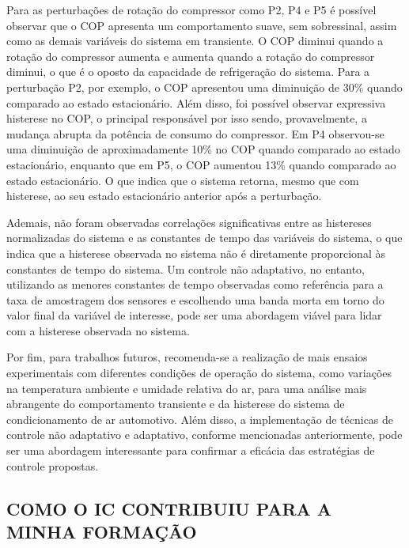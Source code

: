 Para as perturbações de rotação do compressor como P2, P4 e P5 é possível observar que o COP apresenta um comportamento suave, sem sobressinal, assim como as demais variáveis do sistema em transiente. O COP diminui quando a rotação do compressor aumenta e aumenta quando a rotação do compressor diminui, o que é o oposto da capacidade de refrigeração do sistema. Para a perturbação P2, por exemplo, o COP apresentou uma diminuição de 30\% quando comparado ao estado estacionário. 
\newpage
Além disso, foi possível observar expressiva histerese no COP, o principal responsável por isso sendo, provavelmente, a mudança abrupta da potência de consumo do compressor. Em P4  observou-se uma diminuição de aproximadamente 10\% no COP quando comparado ao estado estacionário, enquanto que em P5, o COP aumentou 13\% quando comparado ao estado estacionário.  O que indica que o sistema retorna, mesmo que com histerese, ao seu estado estacionário anterior após a perturbação.

Ademais, não foram observadas correlações significativas entre as histereses normalizadas do sistema e as constantes de tempo das variáveis do sistema, o que indica que a histerese observada no sistema não é diretamente proporcional às constantes de tempo do sistema. Um controle não adaptativo, no entanto, utilizando as menores constantes de tempo observadas como referência para a taxa de amostragem dos sensores e escolhendo uma banda morta em torno do valor final da variável de interesse, pode ser uma abordagem viável para lidar com a histerese observada no sistema.

Por fim, para trabalhos futuros, recomenda-se a realização de mais ensaios experimentais com diferentes condições de operação do sistema, como variações na temperatura ambiente e umidade relativa do ar, para uma análise mais abrangente do comportamento transiente e da histerese do sistema de condicionamento de ar automotivo. Além disso, a implementação de técnicas de controle não adaptativo e adaptativo, conforme mencionadas anteriormente, pode ser uma abordagem interessante para confirmar a eficácia das estratégias de controle propostas.

\newpage
\subsection{\MakeUppercase{ Como o IC Contribuiu para a Minha Formação}}

